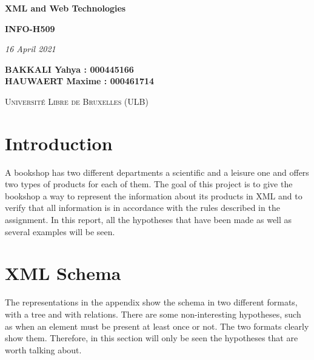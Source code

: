 \documentclass{article}
\begin{document}
\begin{titlepage}
    \begin{center}
        \vspace*{1cm}

        \Huge
        \textbf{XML and Web Technologies}
        \vspace{0.25cm}

        \LARGE
        \textbf{INFO-H509}

        \vspace{0.25cm}
        \LARGE

        \vspace{0.25cm}
        \textit{16 April 2021}

        \vspace{3cm}
           \Large
        \textbf{BAKKALI Yahya : 000445166 \\}
        \textbf{HAUWAERT Maxime : 000461714 \\}

        \vspace{2cm}

        \textsc{Université Libre de Bruxelles (ULB)}


    \end{center}
\end{titlepage}

\tableofcontents
\newpage

\section{Introduction}
A bookshop has two different departments a scientific and a leisure one and offers two types of products for each of them. The goal of this project is to give the bookshop a way to represent the information about its products in XML and to verify that all information is in accordance with the rules described in the assignment. In this report, all the hypotheses that have been made as well as several examples will be seen.

\section{XML Schema}
The representations in the appendix show the schema in two different formats, with a tree and with relations.
There are some non-interesting hypotheses, such as when an element must be present at least once or not. The two formats clearly show them. Therefore, in this section will only be seen the hypotheses that are worth talking about.
\end{document}

